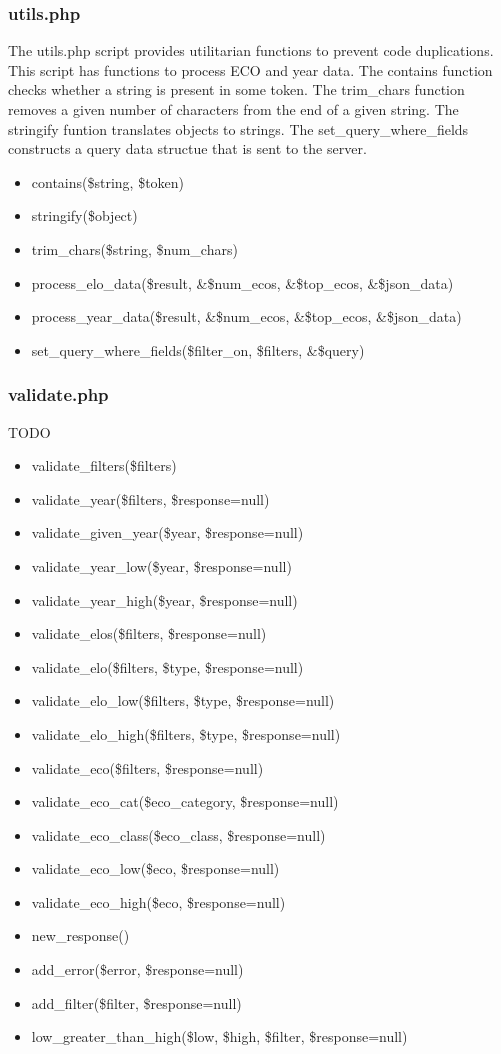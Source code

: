 \documentclass{article}
\begin{document}
\subsubsection{utils.php}
The utils.php script provides utilitarian functions to prevent code
duplications. This script has functions to process ECO and year data. The
contains function checks whether a string is present in some token. The
trim\_chars function removes a given number of characters from the end of a
given string. The stringify funtion translates objects to strings. The
set\_query\_where\_fields constructs a query data structue that is sent to the
server.
\begin{itemize}
	\item contains(\$string, \$token)
	\item stringify(\$object)
	\item trim\_chars(\$string, \$num\_chars)
	\item process\_elo\_data(\$result, \&\$num\_ecos, \&\$top\_ecos,
		\&\$json\_data)
	\item process\_year\_data(\$result, \&\$num\_ecos, \&\$top\_ecos,
		\&\$json\_data)
	\item set\_query\_where\_fields(\$filter\_on, \$filters, \&\$query)
\end{itemize}

\subsubsection{validate.php}
TODO
\begin{itemize}
	\item validate\_filters(\$filters)
	\item validate\_year(\$filters, \$response=null)
	\item validate\_given\_year(\$year, \$response=null)
	\item validate\_year\_low(\$year, \$response=null)
	\item validate\_year\_high(\$year, \$response=null)
	\item validate\_elos(\$filters, \$response=null)
	\item validate\_elo(\$filters, \$type, \$response=null)
	\item validate\_elo\_low(\$filters, \$type, \$response=null)
	\item validate\_elo\_high(\$filters, \$type, \$response=null)
	\item validate\_eco(\$filters, \$response=null)
	\item validate\_eco\_cat(\$eco\_category, \$response=null)
	\item validate\_eco\_class(\$eco\_class, \$response=null)
	\item validate\_eco\_low(\$eco, \$response=null)
	\item validate\_eco\_high(\$eco, \$response=null)
	\item new\_response()
	\item add\_error(\$error, \$response=null)
	\item add\_filter(\$filter, \$response=null)
	\item low\_greater\_than\_high(\$low, \$high, \$filter, \$response=null)
\end{itemize}
\end{document}
